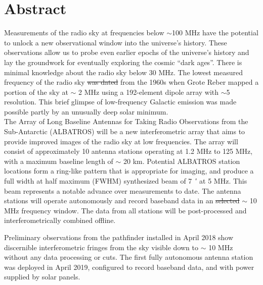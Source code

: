 \section*{Abstract}
	
Measurements of the radio sky at frequencies below $\sim$100 MHz have the potential to unlock a new observational window into the universe’s history. These observations allow us to probe even earlier epochs of the universe’s history and lay the groundwork for eventually
exploring the cosmic “dark ages”. There is minimal knowledge about the radio sky below 30 MHz. The lowest measured frequency of the radio sky \st{was dated}  from the 1960s when Grote Reber mapped a portion of the sky at $ \sim $ 2 MHz using a 192-element dipole array with $\sim$5 \degree
resolution. This brief glimpse of low-frequency Galactic emission was made possible partly by an unusually deep solar minimum.\\

The Array of Long Baseline Antennas for Taking Radio Observations from the Sub-Antarctic (ALBATROS) will be a new interferometric array that aims to provide improved images of the radio sky at low frequencies. The array will consist of approximately 10 antenna stations operating at 1.2 MHz to 125 MHz, with a maximum baseline length of $\sim$ 20 km. Potential ALBATROS station locations form a ring-like pattern that is appropriate for imaging, and produce a full width at half maximum (FWHM) synthesized beam of \SI{7}{\arcminute} at 5 MHz. This
beam represents a notable advance over measurements to date. The antenna stations will operate autonomously and record baseband data in an \st{selected}  $ \sim $ 10 MHz frequency window. The data from all stations will be post-processed and interferometrically combined
offline. \\


Preliminary observations from the pathfinder installed in April 2018 show discernible interferometric fringes from the sky visible down to $\sim$ 10 MHz without any data processing or cuts. The first fully autonomous antenna station was deployed in April 2019, configured to record baseband data, and with power supplied by solar panels. 

